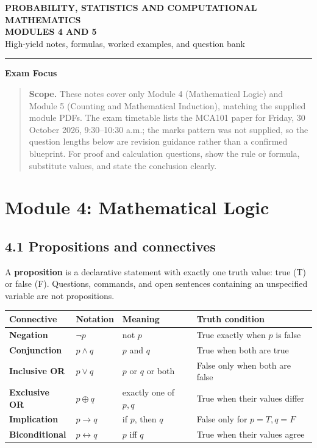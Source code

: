\documentclass[11pt,a4paper]{article}
\newenvironment{exambox}{\par\medskip\noindent\color{blue}\textbf{Exam Focus}\par\smallskip\color{black}\begin{quote}}{\end{quote}\medskip}
\begin{document}
\begin{center}
{\Huge\bfseries\color{navy} PROBABILITY, STATISTICS AND COMPUTATIONAL MATHEMATICS}\\[4pt]
{\LARGE\bfseries MODULES 4 AND 5}\\[8pt]
{\large High-yield notes, formulas, worked examples, and question bank}\\[10pt]
\rule{0.85\textwidth}{0.6pt}
\end{center}

\begin{exambox}
\textbf{Scope.} These notes cover only Module 4 (Mathematical Logic) and Module 5 (Counting and Mathematical Induction), matching the supplied module PDFs. The exam timetable lists the MCA101 paper for Friday, 30 October 2026, 9:30--10:30 a.m.; the marks pattern was not supplied, so the question lengths below are revision guidance rather than a confirmed blueprint. For proof and calculation questions, show the rule or formula, substitute values, and state the conclusion clearly.
\end{exambox}

\tableofcontents
\newpage

\section{Module 4: Mathematical Logic}

\subsection{4.1 Propositions and connectives}
A \textbf{proposition} is a declarative statement with exactly one truth value: true (T) or false (F). Questions, commands, and open sentences containing an unspecified variable are not propositions.

\begin{center}\small
\begin{tabularx}{\textwidth}{>{\bfseries}p{} p{} X X}
\toprule
Connective & Notation & Meaning & Truth condition\\
\midrule
Negation & $\neg p$ & not $p$ & True exactly when $p$ is false\\
Conjunction & $p\land q$ & $p$ and $q$ & True when both are true\\
Inclusive OR & $p\lor q$ & $p$ or $q$ or both & False only when both are false\\
Exclusive OR & $p\oplus q$ & exactly one of $p,q$ & True when their values differ\\
Implication & $p\to q$ & if $p$, then $q$ & False only for $p=T,q=F$\\
Biconditional & $p\leftrightarrow q$ & $p$ iff $q$ & True when their values agree\\
\bottomrule
\end{tabularx}\end{center}
\end{document}
